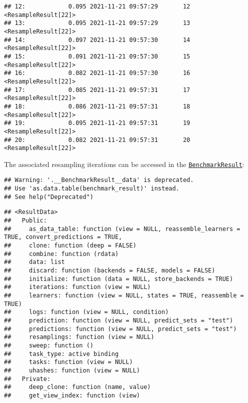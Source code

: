 \documentclass[
]{scrbook}
\newenvironment{Shaded}{\begin{snugshade}}{\end{snugshade}}
\newcommand{\NormalTok}[1]{#1}
\newcommand{\SpecialCharTok}[1]{\textcolor[rgb]{0.00,0.00,0.00}{#1}}
\renewenvironment{Shaded} {\begin{snugshade}\small} {\end{snugshade}}
\begin{document}
\begin{verbatim}
## 12:            0.095 2021-11-21 09:57:29       12 <ResampleResult[22]>
## 13:            0.095 2021-11-21 09:57:29       13 <ResampleResult[22]>
## 14:            0.097 2021-11-21 09:57:30       14 <ResampleResult[22]>
## 15:            0.091 2021-11-21 09:57:30       15 <ResampleResult[22]>
## 16:            0.082 2021-11-21 09:57:30       16 <ResampleResult[22]>
## 17:            0.085 2021-11-21 09:57:31       17 <ResampleResult[22]>
## 18:            0.086 2021-11-21 09:57:31       18 <ResampleResult[22]>
## 19:            0.095 2021-11-21 09:57:31       19 <ResampleResult[22]>
## 20:            0.082 2021-11-21 09:57:31       20 <ResampleResult[22]>
\end{verbatim}

The associated resampling iterations can be accessed in the \href{https://mlr3.mlr-org.com/reference/BenchmarkResult.html}{\texttt{BenchmarkResult}}:

\begin{Shaded}
\end{Shaded}

\begin{verbatim}
## Warning: '.__BenchmarkResult__data' is deprecated.
## Use 'as.data.table(benchmark_result)' instead.
## See help("Deprecated")
\end{verbatim}

\begin{verbatim}
## <ResultData>
##   Public:
##     as_data_table: function (view = NULL, reassemble_learners = TRUE, convert_predictions = TRUE, 
##     clone: function (deep = FALSE) 
##     combine: function (rdata) 
##     data: list
##     discard: function (backends = FALSE, models = FALSE) 
##     initialize: function (data = NULL, store_backends = TRUE) 
##     iterations: function (view = NULL) 
##     learners: function (view = NULL, states = TRUE, reassemble = TRUE) 
##     logs: function (view = NULL, condition) 
##     prediction: function (view = NULL, predict_sets = "test") 
##     predictions: function (view = NULL, predict_sets = "test") 
##     resamplings: function (view = NULL) 
##     sweep: function () 
##     task_type: active binding
##     tasks: function (view = NULL) 
##     uhashes: function (view = NULL) 
##   Private:
##     deep_clone: function (name, value) 
##     get_view_index: function (view)
\end{verbatim}
\end{document}
